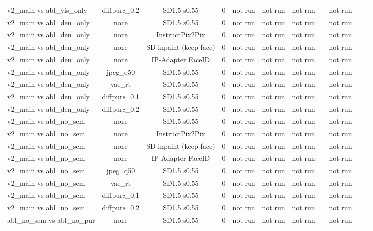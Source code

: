 \begin{table}[t]
{\begin{tabular}{lcccccccccc}
v2\_main vs abl\_vis\_only & diffpure\_0.2 & SD1.5 s0.55 & 0 & not run & not run & not run &  & not run &  &  \\
v2\_main vs abl\_den\_only & none & SD1.5 s0.55 & 0 & not run & not run & not run &  & not run &  &  \\
v2\_main vs abl\_den\_only & none & InstructPix2Pix & 0 & not run & not run & not run &  & not run &  &  \\
v2\_main vs abl\_den\_only & none & SD inpaint (keep-face) & 0 & not run & not run & not run &  & not run &  &  \\
v2\_main vs abl\_den\_only & none & IP-Adapter FaceID & 0 & not run & not run & not run &  & not run &  &  \\
v2\_main vs abl\_den\_only & jpeg\_q50 & SD1.5 s0.55 & 0 & not run & not run & not run &  & not run &  &  \\
v2\_main vs abl\_den\_only & vae\_rt & SD1.5 s0.55 & 0 & not run & not run & not run &  & not run &  &  \\
v2\_main vs abl\_den\_only & diffpure\_0.1 & SD1.5 s0.55 & 0 & not run & not run & not run &  & not run &  &  \\
v2\_main vs abl\_den\_only & diffpure\_0.2 & SD1.5 s0.55 & 0 & not run & not run & not run &  & not run &  &  \\
v2\_main vs abl\_no\_sem & none & SD1.5 s0.55 & 0 & not run & not run & not run &  & not run &  &  \\
v2\_main vs abl\_no\_sem & none & InstructPix2Pix & 0 & not run & not run & not run &  & not run &  &  \\
v2\_main vs abl\_no\_sem & none & SD inpaint (keep-face) & 0 & not run & not run & not run &  & not run &  &  \\
v2\_main vs abl\_no\_sem & none & IP-Adapter FaceID & 0 & not run & not run & not run &  & not run &  &  \\
v2\_main vs abl\_no\_sem & jpeg\_q50 & SD1.5 s0.55 & 0 & not run & not run & not run &  & not run &  &  \\
v2\_main vs abl\_no\_sem & vae\_rt & SD1.5 s0.55 & 0 & not run & not run & not run &  & not run &  &  \\
v2\_main vs abl\_no\_sem & diffpure\_0.1 & SD1.5 s0.55 & 0 & not run & not run & not run &  & not run &  &  \\
v2\_main vs abl\_no\_sem & diffpure\_0.2 & SD1.5 s0.55 & 0 & not run & not run & not run &  & not run &  &  \\
abl\_no\_sem vs abl\_no\_pur & none & SD1.5 s0.55 & 0 & not run & not run & not run &  & not run &  &  \\

\end{tabular}}
\end{table}
